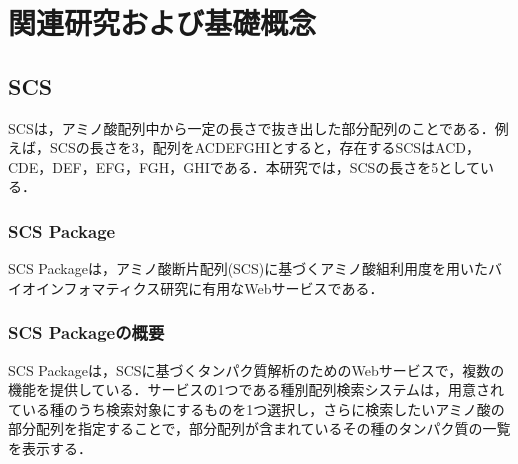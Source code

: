 \chapter{関連研究および基礎概念}

\section{SCS}
SCSは，アミノ酸配列中から一定の長さで抜き出した部分配列のことである．例えば，SCSの長さを3，配列をACDEFGHIとすると，存在するSCSはACD，CDE，DEF，EFG，FGH，GHIである．本研究では，SCSの長さを5としている．
\subsection{SCS Package}
SCS Packageは，アミノ酸断片配列(SCS)に基づくアミノ酸組利用度を用いたバイオインフォマティクス研究に有用なWebサービスである\cite{scspackage}．

\subsection{SCS Packageの概要}
 SCS Packageは，SCSに基づくタンパク質解析のためのWebサービスで，複数の機能を提供している．サービスの1つである種別配列検索システムは，用意されている種のうち検索対象にするものを1つ選択し，さらに検索したいアミノ酸の部分配列を指定することで，部分配列が含まれているその種のタンパク質の一覧を表示する．

